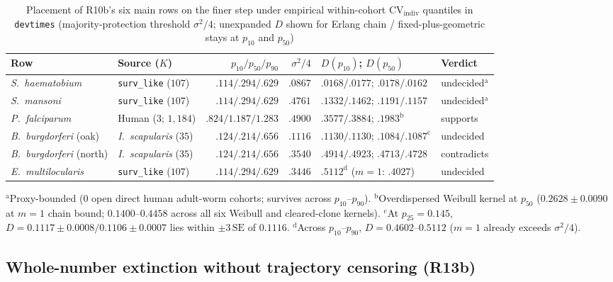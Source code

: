 \begin{table}[htbp]\centering\scriptsize
\setlength{\tabcolsep}{2.2pt}
\caption{Placement of R10b's six main rows on the finer step under empirical within-cohort $\mathrm{CV}_{\mathrm{indiv}}$ quantiles in \texttt{devtimes} (majority-protection threshold $\sigma^2/4$; unexpanded $D$ shown for Erlang chain / fixed-plus-geometric stays at $p_{10}$ and $p_{50}$)}\label{num-esm-tab-devtimes}
\begin{tabular}{llrrll}\toprule
Row & Source ($K$) & $p_{10} / p_{50} / p_{90}$ & $\sigma^2/4$ & $D(p_{10})$; $D(p_{50})$ & Verdict\\\midrule
\emph{S.~haematobium} & \texttt{surv\_like} ($107$) & $.114 / .294 / .629$ & $.0867$ & $.0168/.0177$; $.0178/.0162$ & undecided$^{\mathrm{a}}$\\
\emph{S.~mansoni} & \texttt{surv\_like} ($107$) & $.114 / .294 / .629$ & $.4761$ & $.1332/.1462$; $.1191/.1157$ & undecided$^{\mathrm{a}}$\\
\emph{P.~falciparum} & Human ($3$; $1{,}184$) & $.824 / 1.187 / 1.283$ & $.4900$ & $.3577/.3884$; $.1983^{\mathrm{b}}$ & supports\\
\emph{B.~burgdorferi} (oak) & \emph{I.~scapularis} ($35$) & $.124 / .214 / .656$ & $.1116$ & $.1130/.1130$; $.1084/.1087^{\mathrm{c}}$ & undecided\\
\emph{B.~burgdorferi} (north) & \emph{I.~scapularis} ($35$) & $.124 / .214 / .656$ & $.3540$ & $.4914/.4923$; $.4713/.4728$ & contradicts\\
\emph{E.~multilocularis} & \texttt{surv\_like} ($107$) & $.114 / .294 / .629$ & $.3446$ & $.5112^{\mathrm{d}}$ ($m=1$: $.4027$) & undecided\\\bottomrule
\end{tabular}
\par\smallskip\raggedright\footnotesize
$^{\mathrm{a}}$Proxy-bounded ($0$ open direct human adult-worm cohorts; survives across $p_{10}$--$p_{90}$). $^{\mathrm{b}}$Overdispersed Weibull kernel at $p_{50}$ ($0.2628 \pm 0.0090$ at $m = 1$ chain bound; $0.1400$--$0.4458$ across all six Weibull and cleared-clone kernels). $^{\mathrm{c}}$At $p_{25} = 0.145$, $D = 0.1117 \pm 0.0008 / 0.1106 \pm 0.0007$ lies within $\pm 3\,\mathrm{SE}$ of $0.1116$. $^{\mathrm{d}}$Across $p_{10}$--$p_{90}$, $D = 0.4602$--$0.5112$ ($m=1$ already exceeds $\sigma^2/4$).
\end{table}

\subsection{Whole-number extinction without trajectory censoring (R13b)}\label{num-esm-r13b}

